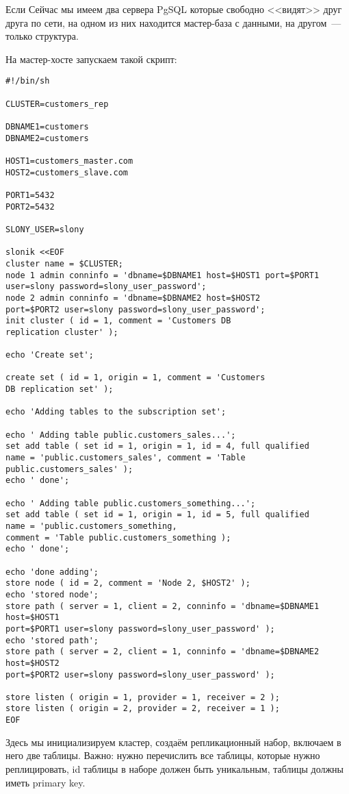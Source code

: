 Если Сейчас мы имеем два сервера PgSQL которые свободно <<видят>> друг друга по сети, на одном из них находится мастер-база с данными, на другом~--- только структура.

На мастер-хосте запускаем такой скрипт:
\begin{lstlisting}[label=lst:slony9,caption=Инициализация кластера]
#!/bin/sh

CLUSTER=customers_rep

DBNAME1=customers
DBNAME2=customers

HOST1=customers_master.com
HOST2=customers_slave.com

PORT1=5432
PORT2=5432

SLONY_USER=slony

slonik <<EOF
cluster name = $CLUSTER;
node 1 admin conninfo = 'dbname=$DBNAME1 host=$HOST1 port=$PORT1
user=slony password=slony_user_password';
node 2 admin conninfo = 'dbname=$DBNAME2 host=$HOST2
port=$PORT2 user=slony password=slony_user_password';
init cluster ( id = 1, comment = 'Customers DB
replication cluster' );

echo 'Create set';

create set ( id = 1, origin = 1, comment = 'Customers
DB replication set' );

echo 'Adding tables to the subscription set';

echo ' Adding table public.customers_sales...';
set add table ( set id = 1, origin = 1, id = 4, full qualified
name = 'public.customers_sales', comment = 'Table public.customers_sales' );
echo ' done';

echo ' Adding table public.customers_something...';
set add table ( set id = 1, origin = 1, id = 5, full qualified
name = 'public.customers_something,
comment = 'Table public.customers_something );
echo ' done';

echo 'done adding';
store node ( id = 2, comment = 'Node 2, $HOST2' );
echo 'stored node';
store path ( server = 1, client = 2, conninfo = 'dbname=$DBNAME1 host=$HOST1
port=$PORT1 user=slony password=slony_user_password' );
echo 'stored path';
store path ( server = 2, client = 1, conninfo = 'dbname=$DBNAME2 host=$HOST2
port=$PORT2 user=slony password=slony_user_password' );

store listen ( origin = 1, provider = 1, receiver = 2 );
store listen ( origin = 2, provider = 2, receiver = 1 );
EOF
\end{lstlisting}

Здесь мы инициализируем кластер, создаём репликационный набор, включаем в него две таблицы. Важно: нужно перечислить все таблицы, которые нужно реплицировать, id таблицы в наборе должен быть уникальным, таблицы должны иметь primary key.

